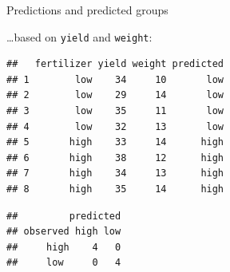\begin{frame}[fragile]{Predictions and predicted groups}
  
\ldots based on \texttt{yield} and \texttt{weight}:

{\footnotesize
\begin{knitrout}
\color{fgcolor}\begin{kframe}
\begin{alltt}
\hlkwb{=}
\hlopt{$}
\end{alltt}
\begin{verbatim}
##   fertilizer yield weight predicted
## 1        low    34     10       low
## 2        low    29     14       low
## 3        low    35     11       low
## 4        low    32     13       low
## 5       high    33     14      high
## 6       high    38     12      high
## 7       high    34     13      high
## 8       high    35     14      high
\end{verbatim}
\begin{alltt}
\hlstd{(}\hlopt{$}\hlopt{$}
\end{alltt}
\begin{verbatim}
##         predicted
## observed high low
##     high    4   0
##     low     0   4
\end{verbatim}
\end{kframe}
\end{knitrout}
}

 
\end{frame}

